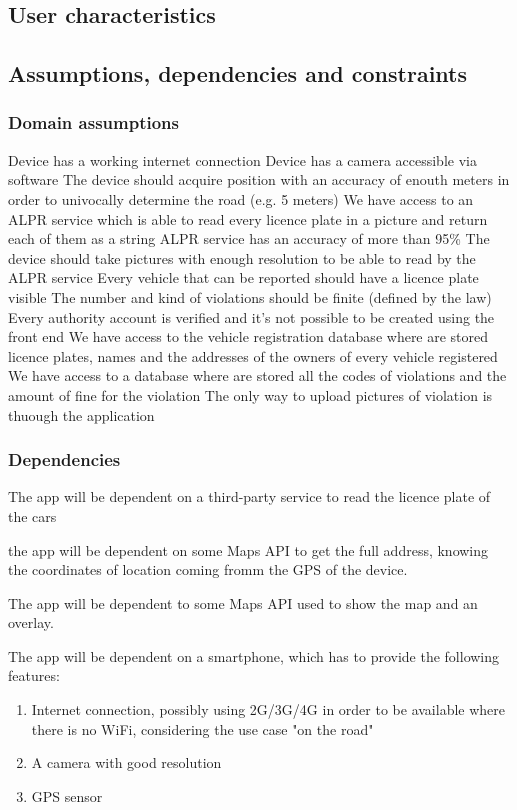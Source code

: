 \subsection{User characteristics }

\subsection{Assumptions, dependencies and constraints}
\subsubsection{Domain assumptions}

\begin{enumerate}
 Device has a working internet connection
 Device has a camera accessible via software
 The device should acquire position with an accuracy of enouth meters in order to univocally determine the road (e.g. 5 meters)
 We have access to an ALPR service which is able to read every licence plate in a picture and return each of them as a string
 ALPR service has an accuracy of more than 95\%
 The device should take pictures with enough resolution to be able to read by the ALPR service
 Every vehicle that can be reported should have a licence plate visible
 The number and kind of violations should be finite (defined by the law)
 Every authority account is verified and it's not possible to be created using the front end
 We have access to the vehicle registration database where are stored licence plates, names and the addresses of the owners of every vehicle registered
 We have access to a database where are stored all the codes of violations and the amount of fine for the violation
 The only way to upload pictures of violation is thuough the application

\end{enumerate}

\subsubsection{Dependencies} \label{Dependencies}

The app will be dependent on a third-party service to read the licence plate of the cars

the app will be dependent on some Maps API to get the full address, knowing the coordinates of location coming fromm the GPS of the device.

The app will be dependent to some Maps API used to show the map and an overlay.



The app will be dependent on a smartphone, which has to provide the following features:
\begin{enumerate}
  \item Internet connection, possibly using 2G/3G/4G in order to be available where there is no WiFi, considering the use case "on the road"
  \item A camera with good resolution
  \item GPS sensor
\end{enumerate}
